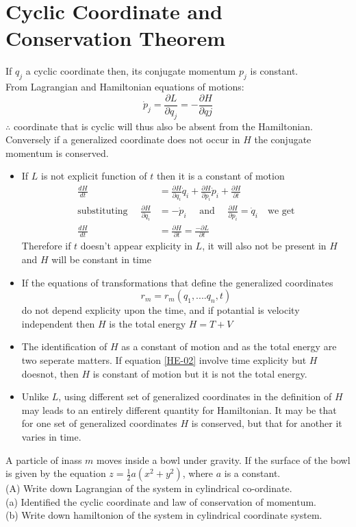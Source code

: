 \section{Cyclic Coordinate and Conservation Theorem}
If $q_j$ a cyclic coordinate then, its conjugate momentum $p_j$ is constant.\\
From Lagrangian and Hamiltonian equations of motions:
$$\dot{p}_{j}=\frac{\partial L}{\partial q_{j}}=-\frac{\partial H}{\partial q j}$$
$\therefore$ coordinate that is cyclic will thus also be absent from the Hamiltonian. Conversely if a generalized coordinate does not occur in $H$ the conjugate momentum is conserved.
\begin{itemize}
	\item If $L$ is not explicit function of $t$ then it is a constant of motion 
	\begin{align*}
	\frac{d H}{d t}&=\frac{\partial H}{\partial q_{i}} \dot{q}_{i}+\frac{\partial H}{\partial p_{i}} \dot{p}_{i}+\frac{\partial H}{\partial t}\\\text{substituting }\quad\frac{\partial H}{\partial q_{i}} &=-\dot{p}_{i}\quad\text{ and }\quad\frac{\partial H}{\partial p_{i}} =\dot{q}_{i}\quad\text{we get}\\
	\frac{d H}{d t}&=\frac{\partial H}{\partial t}=\frac{-\partial L}{\partial t}
 \end{align*}
Therefore if $t$ doesn't appear explicity in $L$, it will also not be present in $H$ and $H$ will be constant in time
	\item If the equations of transformations that define the generalized coordinates
	\begin{equation}
	r_m=r_m(q_1,....q_n,t)\label{HE-02}
	\end{equation}
	do not depend explicity upon the time, and if potantial is velocity independent then $H$ is the total energy $H=T+V$
	\item The identification of $H$ as a constant of motion and as the total energy are two seperate matters. If equation \ref{HE-02} involve time explicity but $H$ doesnot, then $H$ is constant of motion but it is not the total energy.
	\item Unlike $L$, using different set of generalized coordinates in the definition of $H$ may leads to an entirely different quantity for Hamiltonian. It may be that for one set of generalized coordinates $H$ is conserved, but that for another it varies in time.
\end{itemize}
\begin{exercise}
	A particle of inass $m$ moves inside a bowl under gravity. If the surface of the bowl is given by the equation $z=\frac{1}{2} a\left(x^{2}+y^{2}\right)$, where $a$ is a constant.\\
	(A) Write down Lagrangian of the system in cylindrical co-ordinate.\\
	(a) Identified the cyclic coordinate and law of conservation of momentum.\\
	(b) Write down hamiltonion of the system in cylindrical coordinate system.
\end{exercise}
